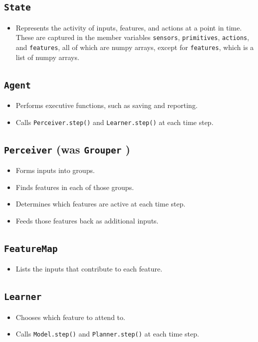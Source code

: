\subsection{\texttt{State}}
\begin{itemize}
\item Represents the activity of inputs, features, and actions at a point in time. These are captured in the member variables \texttt{sensors}, \texttt{primitives}, \texttt{actions}, and \texttt{features}, all of which are numpy arrays, except for \texttt{features}, which is a list of numpy arrays. 
\end{itemize}

\subsection{\texttt{Agent}}
\begin{itemize}
\item Performs executive functions, such as saving and reporting.
\item Calls \texttt{Perceiver.step()} and  \texttt{Learner.step()} at each time step.
\end{itemize}

\subsection{\texttt{Perceiver} (was \texttt{Grouper} )}
\begin{itemize}
\item Forms inputs into groups.
\item Finds features in each of those groups.
\item Determines which features are active at each time step.
\item Feeds those features back as additional inputs.
\end{itemize}

\subsection{\texttt{FeatureMap}}
\begin{itemize}
\item Lists the inputs that contribute to each feature.
\end{itemize}

\subsection{\texttt{Learner}}
\begin{itemize}
\item Chooses which feature to attend to.
\item Calls \texttt{Model.step()} and  \texttt{Planner.step()} at each time step.
\end{itemize}


